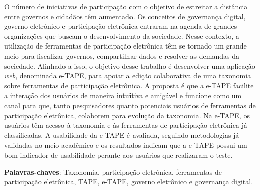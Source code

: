 \newpage
\begin{resumo}
O número de iniciativas de participação com o objetivo de estreitar a distância entre governos e cidadãos têm aumentado. 
Os conceitos de governança digital, governo eletrônico e participação eletrônica entraram na agenda de grandes organizações 
que buscam o desenvolvimento da sociedade. Nesse contexto, a utilização de ferramentas de participação eletrônica têm se tornado um 
grande meio para fiscalizar governos, compartilhar dados e resolver as demandas da sociedade.
Alinhado a isso, o objetivo desse trabalho é desenvolver uma aplicação \textit{web}, denominada e-TAPE, para apoiar a edição 
colaborativa de uma taxonomia sobre ferramentas de participação eletrônica. A proposta é que a e-TAPE facilite a interação dos usuários 
de maneira intuitiva e amigável e funcione como um canal para que, tanto pesquisadores quanto potenciais usuários de ferramentas de 
participação eletrônica, colaborem para evolução da taxonomia. Na e-TAPE, os usuários têm acesso à taxonomia e às ferramentas de 
participação eletrônica já classificadas. A usabilidade da e-TAPE é avaliada, seguindo metodologias já validadas no meio acadêmico e
os resultados indicam que a e-TAPE possui um bom indicador de usabilidade perante aos usuários que realizaram o teste. 

\noindent
 \textbf{Palavras-chaves}: Taxonomia, participação eletrônica, ferramentas de participação eletrônica, TAPE, e-TAPE, governo eletrônico e governança digital.
\end{resumo}
\newpage